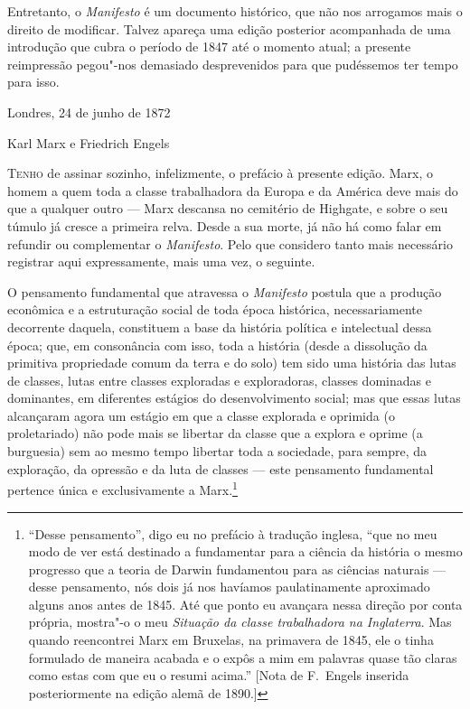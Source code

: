 Entretanto, o \textit{Manifesto} é um documento histórico, que não nos
arrogamos mais o direito de modificar. Talvez apareça uma edição
posterior acompanhada de uma introdução que cubra o período de 1847 até
o momento atual; a presente reimpressão pegou"-nos demasiado
desprevenidos para que pudéssemos ter tempo para isso.
\smallskip

\hfill Londres, 24 de junho de 1872

\hfill Karl Marx e Friedrich Engels


\textsc{Tenho} de assinar sozinho, infelizmente, o prefácio à presente edição.
Marx, o homem a quem toda a classe trabalhadora da Europa e da América
deve mais do que a qualquer outro  ---  Marx descansa no cemitério de
Highgate, e sobre o seu túmulo já cresce a primeira relva. Desde a sua
morte, já não há como falar em refundir ou complementar o
\textit{Manifesto}. Pelo que considero tanto mais necessário registrar
aqui expressamente, mais uma vez, o seguinte.

O pensamento fundamental que atravessa o
\textit{Manifesto} postula que a produção econômica e
a estruturação social de toda época histórica, necessariamente
decorrente daquela, constituem a base da história política e
intelectual dessa época; que, em consonância com isso, toda a história
(desde a dissolução da primitiva propriedade comum da terra e do solo)
tem sido uma história das lutas de classes, lutas entre classes
exploradas e exploradoras, classes dominadas e dominantes, em
diferentes estágios do desenvolvimento social; mas que essas lutas
alcançaram agora um estágio em que a classe explorada e oprimida (o
proletariado) não pode mais se libertar da classe que a explora e
oprime (a burguesia) sem ao mesmo tempo libertar toda a sociedade, para
sempre, da exploração, da opressão e da luta de classes --- este
pensamento fundamental pertence única e exclusivamente a
Marx.\footnote{ “Desse pensamento”, digo eu no prefácio à tradução inglesa, \EP[]
“que no meu modo de ver está destinado a fundamentar para a ciência da 
história o mesmo progresso que a teoria de Darwin fundamentou para as 
ciências naturais  ---  desse pensamento, nós dois já nos havíamos paulatinamente 
aproximado alguns anos antes de 1845. Até que ponto eu avançara nessa direção 
por conta própria, mostra"-o o meu \textit{Situação da classe
trabalhadora na Inglaterra}. Mas quando reencontrei Marx em Bruxelas,
na primavera de 1845, ele o tinha formulado de maneira acabada e o
expôs a mim em palavras quase tão claras como estas com que eu o resumi
acima.” [Nota de F.~Engels inserida posteriormente na edição alemã de
1890.]}

